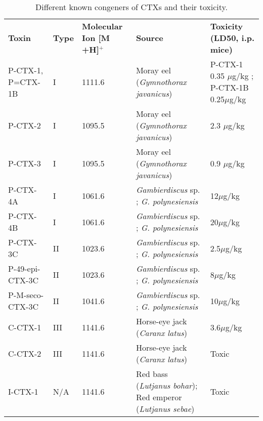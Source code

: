 \documentclass[12pt]{article}
\begin{document}
\begin{table}
\caption{Different known congeners of CTXs and their toxicity.}
\label{tbl:CTXTable}
\begin{tabular}{   p{2cm}  p{1.5cm}  p{2.5cm}  p{4cm}  p{4cm}  }
\textbf{Toxin} & \textbf{Type} & \textbf{Molecular Ion [M +H]$^{+}$} & \textbf{Source} & \textbf{Toxicity (LD50, i.p. mice)} \\
P-CTX-1, P=CTX-1B & I & 1111.6 & Moray eel (\emph{Gymnothorax javanicus}) \cite{murata1990structures,lewis1991purification} & P-CTX-1 0.35 $\mu$g/kg \cite{murata1990structures}; P-CTX-1B 0.25$\mu$g/kg \cite{lewis1991purification} \\
P-CTX-2 & I & 1095.5 \cite{lewis1991purification} & Moray eel (\emph{Gymnothorax javanicus}) \cite{lewis1991purification} & 2.3 $\mu$g/kg \cite{lewis1991purification} \\
 P-CTX-3 & I & 1095.5 \cite{lewis1991purification} & Moray eel (\emph{Gymnothorax javanicus}) \cite{lewis1991purification} & 0.9 $\mu$g/kg \cite{lewis1991purification} \\
 P-CTX-4A & I & 1061.6 \cite{yasumoto2000structural} & \emph{Gambierdiscus} sp. \cite{yasumoto2000structural}; \emph{G. polynesiensis} \cite{chinain2010growth} & 12$\mu$g/kg \cite{chinain2010growth} \\
 P-CTX-4B & I & 1061.6 \cite{yasumoto2000structural} & \emph{Gambierdiscus} sp. \cite{yasumoto2000structural}; \emph{G. polynesiensis} \cite{chinain2010growth} & 20$\mu$g/kg \cite{chinain2010growth}\\
 P-CTX-3C & II & 1023.6 \cite{satake1993structure} &  \emph{Gambierdiscus} sp. \cite{satake1993structure}; \emph{G. polynesiensis} \cite{chinain2010growth} & 2.5$\mu$g/kg \cite{chinain2010growth}\\
 P-49-epi-CTX-3C & II & 1023.6 \cite{chinain2010growth} & \emph{Gambierdiscus} sp. \cite{satake1993structure}; \emph{G. polynesiensis} \cite{chinain2010growth} & 8$\mu$g/kg\cite{chinain2010growth}\\
 P-M-seco-CTX-3C & II & 1041.6 \cite{chinain2010growth} &\emph{Gambierdiscus} sp. \cite{satake1993structure}; \emph{G. polynesiensis} \cite{chinain2010growth} & 10$\mu$g/kg \cite{chinain2010growth}\\
 C-CTX-1 & III & 1141.6 \cite{vernoux1997isolation,pottier2002characterisation} & Horse-eye jack (\emph{Caranx latus}) \cite{vernoux1997isolation,pottier2002characterisation} & 3.6$\mu$g/kg \cite{vernoux1997isolation}\\
 C-CTX-2 & III & 1141.6 \cite{vernoux1997isolation,pottier2002characterisation}& Horse-eye jack (\emph{Caranx latus}) \cite{vernoux1997isolation,pottier2002characterisation} & Toxic \cite{vernoux1997isolation}\\
 I-CTX-1 & N/A & 1141.6 \cite{hamilton2002isolation}& Red bass (\emph{Lutjanus bohar}); Red emperor (\emph{Lutjanus sebae}) \cite{hamilton2002isolation} & Toxic \cite{hamilton2002isolation} \\
\end{tabular}
\end{table}
\FloatBarrier
\end{document}
